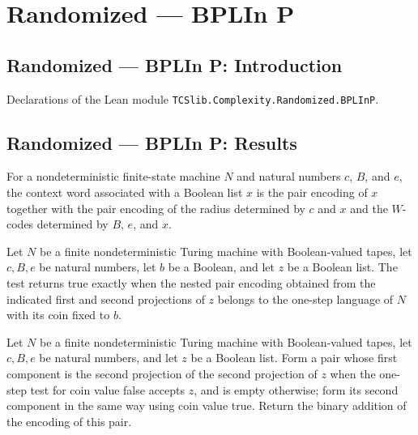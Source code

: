 \section{Randomized --- BPLIn P}
\subsection*{Randomized --- BPLIn P: Introduction}

Declarations of the Lean module \texttt{TCSlib.Complexity.Randomized.BPLInP}.

\subsection*{Randomized --- BPLIn P: Results}

\begin{definition}
\label{Randomized.BPLInP.ctxW}
\leanok
{}
For a nondeterministic finite-state machine $N$ and natural numbers $c$, $B$, and $e$,
the context word associated with a Boolean list $x$ is the pair encoding of $x$ together
with the pair encoding of the radius determined by $c$ and $x$ and the $W$-codes
determined by $B$, $e$, and $x$.
\end{definition}

\begin{definition}
\label{Randomized.BPLInP.stepTest}
\leanok
{}
Let $N$ be a finite nondeterministic Turing machine with Boolean-valued tapes, let
$c,B,e$ be natural numbers, let $b$ be a Boolean, and let $z$ be a Boolean list. The
test returns true exactly when the nested pair encoding obtained from the indicated
first and second projections of $z$ belongs to the one-step language of $N$ with its
coin fixed to $b$.
\end{definition}

\begin{definition}
\label{Randomized.BPLInP.entryW}
\leanok
{}
Let $N$ be a finite nondeterministic Turing machine with Boolean-valued tapes, let
$c,B,e$ be natural numbers, and let $z$ be a Boolean list. Form a pair whose first
component is the second projection of the second projection of $z$ when the one-step
test for coin value false accepts $z$, and is empty otherwise; form its second component
in the same way using coin value true. Return the binary addition of the encoding of
this pair.
\end{definition}

